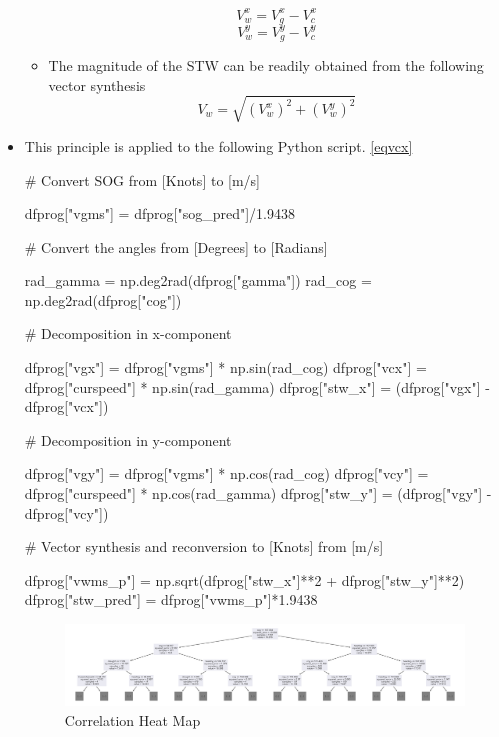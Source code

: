 \begin{itemize}
\begin{itemize}
        \begin{equation}
            V_{w}^x = V_{g}^x - V_{c}^x    
        \end{equation}
        \begin{equation}
            V_{w}^y = V_{g}^y - V_{c}^y 
        \end{equation}
        \item The magnitude of the STW can be readily obtained from the following vector synthesis
        \begin{equation}
            V_w = \sqrt{(V_{w}^x)^2 + (V_{w}^y)^2} 
        \end{equation}
    \end{itemize}
    \newpage

    \item This principle is applied to the following Python script. \ref{eqvcx}

\begin{python}
       
        # Convert SOG from [Knots] to [m/s]
    
        dfprog["vgms"] = dfprog["sog_pred"]/1.9438
        
        # Convert the angles from [Degrees] to [Radians]

        rad_gamma = np.deg2rad(dfprog["gamma"])
        rad_cog = np.deg2rad(dfprog["cog"])

        # Decomposition in x-component

        dfprog["vgx"] = dfprog["vgms"] * np.sin(rad_cog)
        dfprog["vcx"] = dfprog["curspeed"] * np.sin(rad_gamma)
        dfprog["stw_x"] = (dfprog["vgx"] - dfprog["vcx"])

        # Decomposition in y-component

        dfprog["vgy"] = dfprog["vgms"] * np.cos(rad_cog)
        dfprog["vcy"] = dfprog["curspeed"] * np.cos(rad_gamma)
        dfprog["stw_y"] = (dfprog["vgy"] - dfprog["vcy"])

        # Vector synthesis and reconversion to [Knots] from [m/s]

        dfprog["vwms_p"] = np.sqrt(dfprog["stw_x"]**2 + dfprog["stw_y"]**2)
        dfprog["stw_pred"] = dfprog["vwms_p"]*1.9438  

    \end{python}
\newpage

\begin{figure}
    \includegraphics[width=\linewidth,height=\textheight,keepaspectratio]{02_figures/rfrftree.png}
    \caption{Correlation Heat Map}
    \label{fig:Random Forest Regression Tree}
\end{figure}


\end{itemize}
